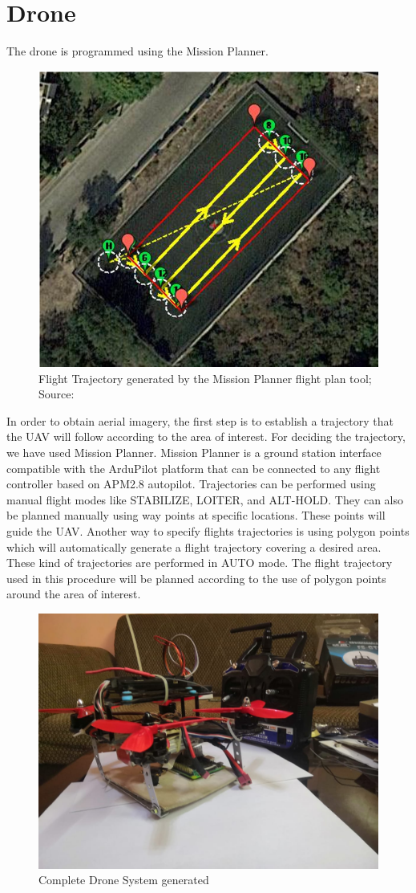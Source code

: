 \section{Drone}
The drone is programmed using the Mission Planner. 
\begin{figure}[H]
    \centering
    \includegraphics[width=0.7\linewidth]{SummerInterReport/project/Images-Major/flightTraj.png}
    \caption{Flight Trajectory generated by the Mission Planner flight plan tool; Source: \cite{one}}
    \label{fig:compEy}
\end{figure}
 In order to obtain aerial imagery, the first step is to establish a trajectory that the UAV will follow according to the area of interest. For deciding the trajectory, we have used Mission Planner. Mission Planner is a ground station interface compatible with the ArduPilot platform that can be connected to any flight controller based on APM2.8 autopilot. Trajectories can be performed using manual flight modes like STABILIZE, LOITER, and ALT-HOLD. They can also be planned manually using way points at specific locations. These points will guide the UAV. Another way to specify flights trajectories is using polygon points which will automatically generate a flight trajectory covering a desired area. These kind of trajectories are performed in AUTO mode. The flight trajectory used in this procedure will be planned according to the use of polygon points around the area of interest. 
\begin{figure}[H]
    \centering
    \includegraphics[width=0.7\linewidth]{SummerInterReport/project/Images-Major/complete_drone.jpeg}
    \caption{Complete Drone System generated}
    \label{fig:compEy}
\end{figure}

